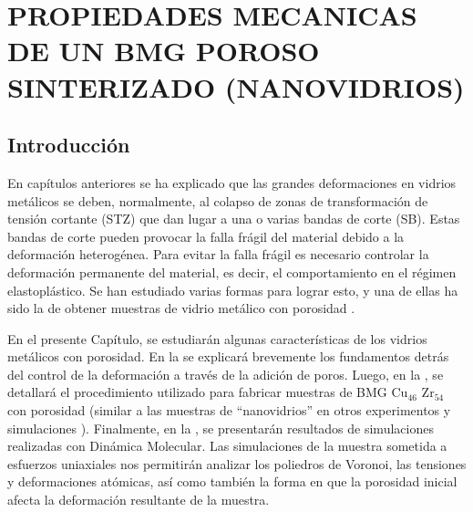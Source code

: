 
\chapter{PROPIEDADES MECANICAS DE UN BMG POROSO SINTERIZADO (NANOVIDRIOS)} %

\label{C5} %




\section{Introducción}
\label{S5_1}

En capítulos anteriores se ha explicado que las grandes deformaciones en vidrios metálicos se deben, normalmente,
al colapso de zonas de transformación de tensión cortante (STZ) que dan lugar a una o varias bandas de corte (SB).
Estas bandas de corte pueden provocar la falla frágil del material debido a la deformación heterogénea.
Para evitar la falla frágil es necesario controlar la deformación permanente del material, es decir, el comportamiento en el régimen elastoplástico.
Se han estudiado varias formas para lograr esto, y una de ellas ha sido la de obtener muestras de vidrio metálico con porosidad 
\citep{guan13,wang10,schuh07,liontas14}.

En el presente Capítulo, se estudiarán algunas características de los vidrios metálicos con porosidad. En la  se explicará
brevemente los fundamentos detrás del control de la deformación a través de la adición de poros.
Luego, en la , se detallará el procedimiento utilizado para fabricar muestras de BMG Cu$_{46}$ Zr$_{54}$ con porosidad
(similar a las muestras de ``nanovidrios'' en otros experimentos y simulaciones \citep{adibi13,albe13}). Finalmente, en la ,
se presentarán resultados de simulaciones
realizadas con Dinámica Molecular. Las simulaciones de la muestra sometida a esfuerzos uniaxiales nos permitirán analizar los poliedros
de Voronoi, las tensiones y deformaciones atómicas, así como también la forma en que la porosidad inicial afecta la deformación resultante
de la muestra.

